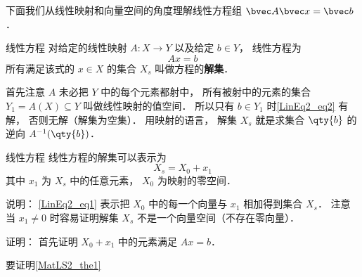 

下面我们从线性映射和向量空间的角度理解线性方程组 $\bvec A \bvec x = \bvec b$．


\begin{definition}{线性方程}
对给定的线性映射 $A:X\to Y$ 以及给定 $b \in Y$， 线性方程为
\begin{equation}\label{LinEq2_eq2}
Ax = b
\end{equation}
所有满足该式的 $x \in X$ 的集合 $X_s$ 叫做方程的\textbf{解集}．
\end{definition}

首先注意 $A$ 未必把 $Y$ 中的每个元素都射中， 所有被射中的元素的集合 $Y_1 = A(X) \subseteq Y$ 叫做线性映射的值空间． 所以只有 $b \in Y_1$ 时\autoref{LinEq2_eq2} 有解， 否则无解（解集为空集）． 用映射的语言， 解集 $X_s$ 就是求集合 $\qty{b}$ 的逆向 $A^{-1}(\qty{b})$．

\begin{theorem}{线性方程}
线性方程的解集可以表示为
\begin{equation}\label{LinEq2_eq1}
X_s = X_0 + x_1
\end{equation}
其中 $x_1$ 为 $X_s$ 中的任意元素，  $X_0$ 为映射的零空间．
\end{theorem}
说明： \autoref{LinEq2_eq1} 表示把 $X_0$ 中的每一个向量与 $x_1$ 相加得到集合 $X_s$． 注意当 $x_1 \ne 0$ 时容易证明解集 $X_s$ 不是一个向量空间（不存在零向量）．

证明： 首先证明 $X_0 + x_1$ 中的元素满足 $Ax = b$．

要证明\autoref{MatLS2_the1}~
